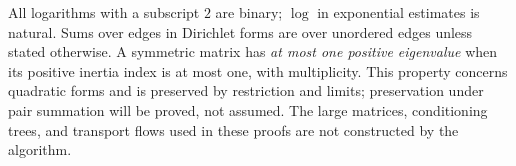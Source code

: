 All logarithms with a subscript $2$ are binary; $\log$ in exponential
estimates is natural. Sums over edges in Dirichlet forms are over
unordered edges unless stated otherwise. A symmetric matrix has
\emph{at most one positive eigenvalue} when its positive inertia index
is at most one, with multiplicity. This property concerns quadratic
forms and is preserved by restriction and limits; preservation under
pair summation will be proved, not assumed. The large matrices,
conditioning trees, and transport flows used in these proofs are not
constructed by the algorithm.

